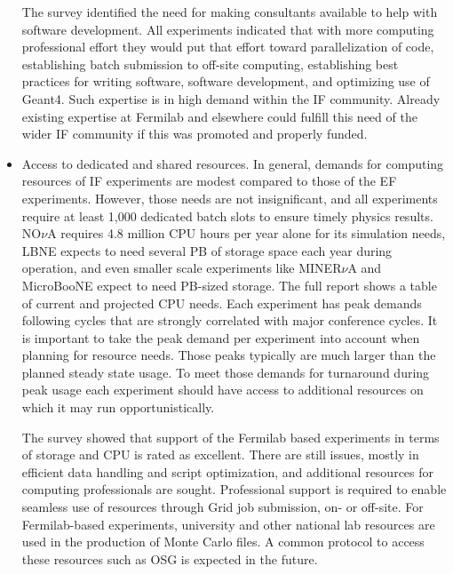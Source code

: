 \begin{itemize}
The survey identified the need for making consultants available to help with
software development. All experiments indicated that with more computing
professional effort they would put that effort toward parallelization of code,
establishing batch submission to off-site computing, establishing best
practices for writing software, software development, and  optimizing use of
Geant4. Such expertise is in high demand within the IF community. Already
existing expertise at Fermilab and elsewhere could fulfill this need of the
wider IF community if this was promoted and properly funded.

\item Access to dedicated and shared resources.  In general, demands for
computing resources of IF experiments are modest compared to those of the EF
experiments.  However, those needs are not insignificant, and all experiments
require at least 1,000 dedicated batch slots to ensure timely physics results. 
NO$\nu$A requires 4.8 million
CPU hours per year alone for its simulation needs, LBNE expects to need
several PB of storage space each year during operation, and even smaller scale
experiments like MINER$\nu$A and MicroBooNE expect to need PB-sized storage.
The full report shows a table of current and projected CPU needs. Each
experiment has peak demands following cycles that are strongly correlated with
major conference cycles.  It is important to take the peak demand per
experiment into account when planning for resource needs. Those peaks
typically are much larger than the planned steady state usage. To meet those
demands for turnaround during peak usage each experiment should have access to
additional resources on which it may run opportunistically.

The survey showed that support of the Fermilab based experiments in terms of
storage and CPU is rated as excellent.  There are still issues, mostly in
efficient data handling and script optimization, and additional resources for
computing professionals are sought.  Professional support is required to
enable seamless use of resources through Grid job submission, on- or off-site.
For Fermilab-based experiments, university and other national lab resources
are used in the production of Monte Carlo files. A common protocol to access
these resources such as OSG is expected in the future.


\end{itemize}
